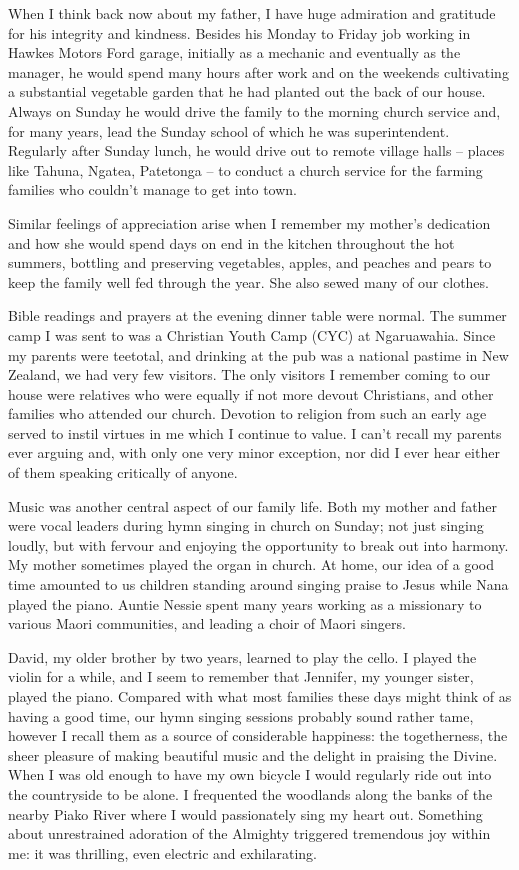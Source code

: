 When I think back now about my father, I have huge admiration and
gratitude for his integrity and kindness. Besides his Monday to Friday
job working in Hawkes Motors Ford garage, initially as a mechanic and
eventually as the manager, he would spend many hours after work and on
the weekends cultivating a substantial vegetable garden that he had
planted out the back of our house. Always on Sunday he would drive the
family to the morning church service and, for many years, lead the
Sunday school of which he was superintendent. Regularly after Sunday
lunch, he would drive out to remote village halls -- places like Tahuna,
Ngatea, Patetonga -- to conduct a church service for the farming
families who couldn't manage to get into town.

Similar feelings of appreciation arise when I remember my mother's
dedication and how she would spend days on end in the kitchen throughout
the hot summers, bottling and preserving vegetables, apples, and peaches
and pears to keep the family well fed through the year. She also sewed
many of our clothes.

Bible readings and prayers at the evening dinner table were normal. The
summer camp I was sent to was a Christian Youth Camp (CYC) at
Ngaruawahia. Since my parents were teetotal, and drinking at the pub was
a national pastime in New Zealand, we had very few visitors. The only
visitors I remember coming to our house were relatives who were equally
if not more devout Christians, and other families who attended our
church. Devotion to religion from such an early age served to instil
virtues in me which I continue to value. I can't recall my parents ever
arguing and, with only one very minor exception, nor did I ever hear
either of them speaking critically of anyone.

Music was another central aspect of our family life. Both my mother and
father were vocal leaders during hymn singing in church on Sunday; not
just singing loudly, but with fervour and enjoying the opportunity to
break out into harmony. My mother sometimes played the organ in church.
At home, our idea of a good time amounted to us children standing around
singing praise to Jesus while Nana played the piano. Auntie Nessie spent
many years working as a missionary to various Maori communities, and
leading a choir of Maori singers.

David, my older brother by two years, learned to play the cello. I
played the violin for a while, and I seem to remember that Jennifer, my
younger sister, played the piano. Compared with what most families these
days might think of as having a good time, our hymn singing sessions
probably sound rather tame, however I recall them as a source of
considerable happiness: the togetherness, the sheer pleasure of making
beautiful music and the delight in praising the Divine. When I was old
enough to have my own bicycle I would regularly ride out into the
countryside to be alone. I frequented the woodlands along the banks of
the nearby Piako River where I would passionately sing my heart out.
Something about unrestrained adoration of the Almighty triggered
tremendous joy within me: it was thrilling, even electric and
exhilarating.

